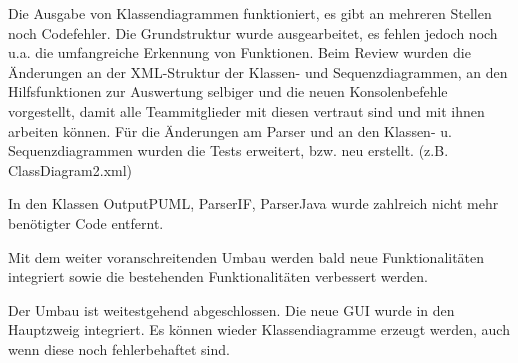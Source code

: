 Die Ausgabe von Klassendiagrammen funktioniert, es gibt an mehreren Stellen noch Codefehler. Die Grundstruktur wurde ausgearbeitet, es fehlen jedoch noch u.a. die umfangreiche Erkennung von Funktionen.
Beim Review wurden die Änderungen an der XML-Struktur der Klassen- und Sequenzdiagrammen, an den Hilfsfunktionen zur Auswertung selbiger und die neuen Konsolenbefehle vorgestellt, damit alle Teammitglieder mit diesen vertraut sind und mit ihnen arbeiten können.
Für die Änderungen am Parser und an den Klassen- u. Sequenzdiagrammen wurden die Tests erweitert, bzw. neu erstellt. (z.B. ClassDiagram2.xml)

In den Klassen OutputPUML, ParserIF, ParserJava wurde zahlreich nicht mehr benötigter Code entfernt.

\nsecend%

Mit dem weiter voranschreitenden Umbau werden bald neue Funktionalitäten integriert sowie die bestehenden Funktionalitäten verbessert werden.
\nsecend%

Der Umbau ist weitestgehend abgeschlossen. Die neue GUI wurde in den Hauptzweig integriert. Es können wieder Klassendiagramme erzeugt werden, auch wenn diese noch fehlerbehaftet sind.
\nsecend%